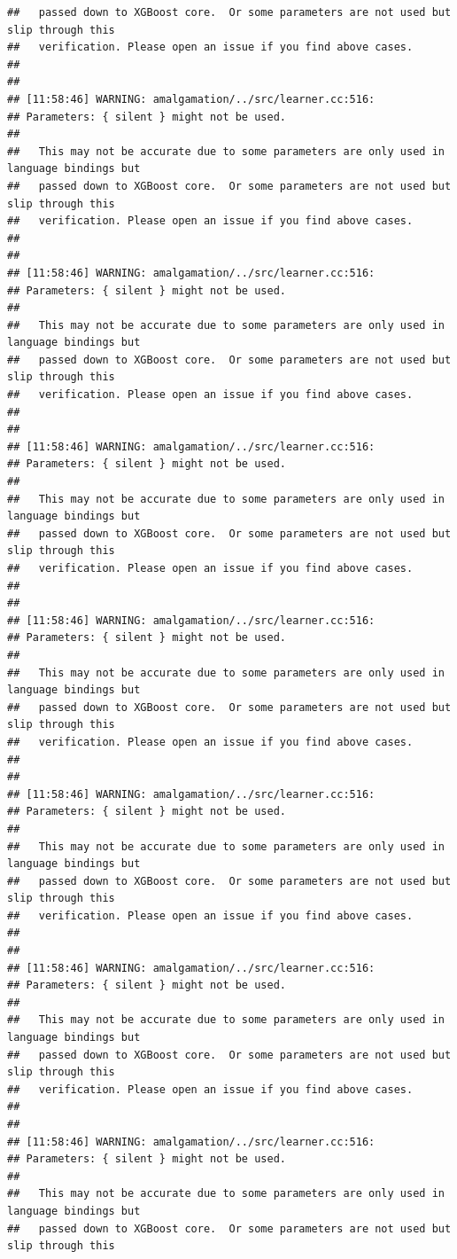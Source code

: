 \documentclass[AMS,STIX2COL]{WileyNJD-v2}\usepackage[]{graphicx}\usepackage[]{color}
\makeatletter
\newenvironment{kframe}{%
 \def\at@end@of@kframe{}%
 \ifinner\ifhmode%
  \def\at@end@of@kframe{\end{minipage}}%
  \begin{minipage}{\columnwidth}%
 \fi\fi%
 \def\FrameCommand##1{\hskip\@totalleftmargin \hskip-\fboxsep
 \colorbox{shadecolor}{##1}\hskip-\fboxsep
     \hskip-\linewidth \hskip-\@totalleftmargin \hskip\columnwidth}%
 \MakeFramed {\advance\hsize-\width
   \@totalleftmargin\z@ \linewidth\hsize
   \@setminipage}}%
 {\par\unskip\endMakeFramed%
 \at@end@of@kframe}
\newenvironment{knitrout}{}{} %
\makeatother
\begin{document}
\begin{knitrout}
\begin{kframe}
\begin{verbatim}
##   passed down to XGBoost core.  Or some parameters are not used but slip through this
##   verification. Please open an issue if you find above cases.
## 
## 
## [11:58:46] WARNING: amalgamation/../src/learner.cc:516: 
## Parameters: { silent } might not be used.
## 
##   This may not be accurate due to some parameters are only used in language bindings but
##   passed down to XGBoost core.  Or some parameters are not used but slip through this
##   verification. Please open an issue if you find above cases.
## 
## 
## [11:58:46] WARNING: amalgamation/../src/learner.cc:516: 
## Parameters: { silent } might not be used.
## 
##   This may not be accurate due to some parameters are only used in language bindings but
##   passed down to XGBoost core.  Or some parameters are not used but slip through this
##   verification. Please open an issue if you find above cases.
## 
## 
## [11:58:46] WARNING: amalgamation/../src/learner.cc:516: 
## Parameters: { silent } might not be used.
## 
##   This may not be accurate due to some parameters are only used in language bindings but
##   passed down to XGBoost core.  Or some parameters are not used but slip through this
##   verification. Please open an issue if you find above cases.
## 
## 
## [11:58:46] WARNING: amalgamation/../src/learner.cc:516: 
## Parameters: { silent } might not be used.
## 
##   This may not be accurate due to some parameters are only used in language bindings but
##   passed down to XGBoost core.  Or some parameters are not used but slip through this
##   verification. Please open an issue if you find above cases.
## 
## 
## [11:58:46] WARNING: amalgamation/../src/learner.cc:516: 
## Parameters: { silent } might not be used.
## 
##   This may not be accurate due to some parameters are only used in language bindings but
##   passed down to XGBoost core.  Or some parameters are not used but slip through this
##   verification. Please open an issue if you find above cases.
## 
## 
## [11:58:46] WARNING: amalgamation/../src/learner.cc:516: 
## Parameters: { silent } might not be used.
## 
##   This may not be accurate due to some parameters are only used in language bindings but
##   passed down to XGBoost core.  Or some parameters are not used but slip through this
##   verification. Please open an issue if you find above cases.
## 
## 
## [11:58:46] WARNING: amalgamation/../src/learner.cc:516: 
## Parameters: { silent } might not be used.
## 
##   This may not be accurate due to some parameters are only used in language bindings but
##   passed down to XGBoost core.  Or some parameters are not used but slip through this

\end{verbatim}
\end{kframe}
\end{knitrout}
\end{document}
